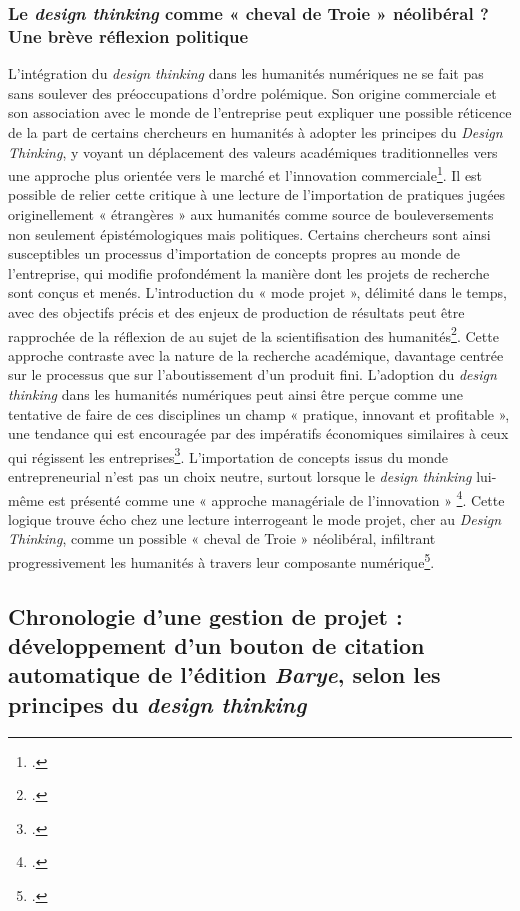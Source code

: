 \subsubsection{Le \textit{design thinking} comme « cheval de Troie » néolibéral ? Une brève réflexion politique}

L’intégration du \textit{design thinking} dans les humanités numériques ne se fait pas sans soulever des préoccupations d’ordre polémique. Son origine commerciale et son association avec le monde de l’entreprise peut expliquer une possible réticence de la part de certains chercheurs en humanités à adopter les principes du \textit{Design Thinking}, y voyant un déplacement des valeurs académiques traditionnelles vers une approche plus orientée vers le marché et l'innovation commerciale\footcite[p.147-48]{grumbach_design_2023}. Il est possible de relier cette critique à une lecture de l’importation de pratiques jugées originellement « étrangères » aux humanités comme source de bouleversements non seulement épistémologiques mais politiques. 
Certains chercheurs sont ainsi susceptibles un processus d’importation de concepts propres au monde de l’entreprise, qui modifie profondément la manière dont les projets de recherche sont conçus et menés. L’introduction du « mode projet », délimité dans le temps, avec des objectifs précis et des enjeux de production de résultats peut être rapprochée de la réflexion de \citeauthor{pawlicka_data_2017} au sujet de la scientifisation des humanités\footcite{pawlicka_data_2017}. Cette approche contraste avec la nature de la recherche académique, davantage centrée sur le processus que sur l’aboutissement d’un produit fini.
L’adoption du \textit{design thinking} dans les humanités numériques peut ainsi être perçue comme une tentative de faire de ces disciplines un champ « pratique, innovant et profitable », une tendance qui est encouragée par des impératifs économiques similaires à ceux qui régissent les entreprises\footcite[p.526-28]{pawlicka_data_2017}. L'importation de concepts issus du monde entrepreneurial n'est pas un choix neutre, surtout lorsque le \textit{design thinking} lui-même est présenté comme une « approche managériale de l'innovation » \footcite[p.12]{peche_design_2016}. Cette logique trouve écho chez une lecture interrogeant le mode projet, cher au \textit{Design Thinking}, comme un possible « cheval de Troie » néolibéral, infiltrant progressivement les humanités à travers leur composante numérique\footcite{smaniotto_dh_2014}.

\subsection{Chronologie d’une gestion de projet : développement d’un bouton de citation automatique de l’édition \textit{Barye}, selon les principes du \textit{design thinking}}

